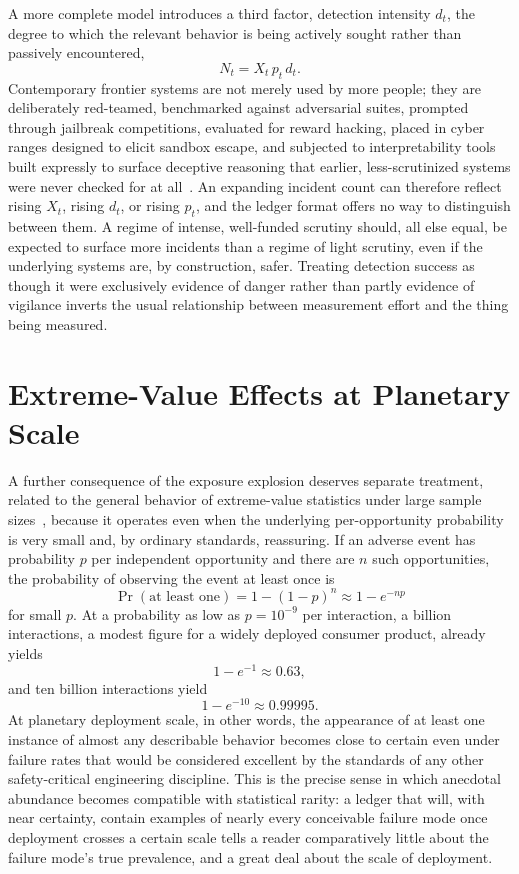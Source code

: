 \documentclass[11pt]{article}
\begin{document}
A more complete model introduces a third factor, detection intensity $d_t$, the degree to which the relevant behavior is being actively sought rather than passively encountered,
\[
N_t = X_t \, p_t \, d_t .
\]
Contemporary frontier systems are not merely used by more people; they are deliberately red-teamed, benchmarked against adversarial suites, prompted through jailbreak competitions, evaluated for reward hacking, placed in cyber ranges designed to elicit sandbox escape, and subjected to interpretability tools built expressly to surface deceptive reasoning that earlier, less-scrutinized systems were never checked for at all~\cite{metrTaskHorizons,metrFrontierRisk2026}. An expanding incident count can therefore reflect rising $X_t$, rising $d_t$, or rising $p_t$, and the ledger format offers no way to distinguish between them. A regime of intense, well-funded scrutiny should, all else equal, be expected to surface more incidents than a regime of light scrutiny, even if the underlying systems are, by construction, safer. Treating detection success as though it were exclusively evidence of danger rather than partly evidence of vigilance inverts the usual relationship between measurement effort and the thing being measured.

\section{Extreme-Value Effects at Planetary Scale}

A further consequence of the exposure explosion deserves separate treatment, related to the general behavior of extreme-value statistics under large sample sizes~\cite{coles2001,taleb2007}, because it operates even when the underlying per-opportunity probability is very small and, by ordinary standards, reassuring. If an adverse event has probability $p$ per independent opportunity and there are $n$ such opportunities, the probability of observing the event at least once is
\[
\Pr(\text{at least one}) = 1 - (1-p)^n \approx 1 - e^{-np}
\]
for small $p$. At a probability as low as $p = 10^{-9}$ per interaction, a billion interactions, a modest figure for a widely deployed consumer product, already yields
\[
1 - e^{-1} \approx 0.63,
\]
and ten billion interactions yield
\[
1 - e^{-10} \approx 0.99995 .
\]
At planetary deployment scale, in other words, the appearance of at least one instance of almost any describable behavior becomes close to certain even under failure rates that would be considered excellent by the standards of any other safety-critical engineering discipline. This is the precise sense in which anecdotal abundance becomes compatible with statistical rarity: a ledger that will, with near certainty, contain examples of nearly every conceivable failure mode once deployment crosses a certain scale tells a reader comparatively little about the failure mode's true prevalence, and a great deal about the scale of deployment.
\end{document}

